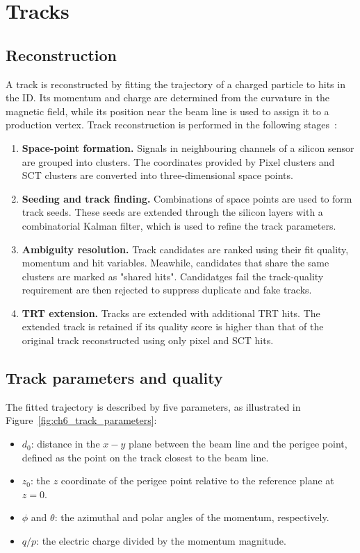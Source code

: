 \section{Tracks}
\label{sec:ch6_tracks}

\subsection{Reconstruction}

A track is reconstructed by fitting the trajectory of a charged particle to hits in the ID.
Its momentum and charge are determined from the curvature in the magnetic field, while its position near the beam line is used to assign it to a production vertex.
Track reconstruction is performed in the following stages~\cite{ATLAS2017DenseTracking}:
\begin{enumerate}
    \item \textbf{Space-point formation.} Signals in neighbouring channels of a silicon sensor are grouped into clusters. The coordinates provided by Pixel clusters and SCT clusters are converted into three-dimensional space points.
    \item \textbf{Seeding and track finding.} Combinations of space points are used to form track seeds. These seeds are extended through the silicon layers with a combinatorial Kalman filter, which is used to refine the track parameters.
    \item \textbf{Ambiguity resolution.} Track candidates are ranked using their fit quality, momentum and hit variables. Meawhile, candidates that share the same clusters are marked as "shared hits". Candidatges fail the track-quality requirement are then rejected to suppress duplicate and fake tracks.
    \item \textbf{TRT extension.} Tracks are extended with additional TRT hits. The extended track is retained if its quality score is higher than that of the original track reconstructed using only pixel and SCT hits.
\end{enumerate}

\subsection{Track parameters and quality}

The fitted trajectory is described by five parameters, as illustrated in Figure~\ref{fig:ch6_track_parameters}:
\begin{itemize}
    \item $d_0$: distance in the $x-y$ plane between the beam line and the perigee point, defined as the point on the track closest to the beam line.
    \item $z_0$: the $z$ coordinate of the perigee point relative to the reference plane at $z=0$.
    \item $\phi$ and $\theta$: the azimuthal and polar angles of the momentum, respectively.
    \item $q/p$: the electric charge divided by the momentum magnitude.
\end{itemize}

